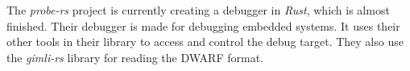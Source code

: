 
The \emph{probe-rs} project is currently creating a debugger in \emph{Rust}, which is almost finished.
Their debugger is made for debugging embedded systems.
It uses their other tools in their library to access and control the debug target.
They also use the \emph{gimli-rs} library for reading the \gls{DWARF} format.


